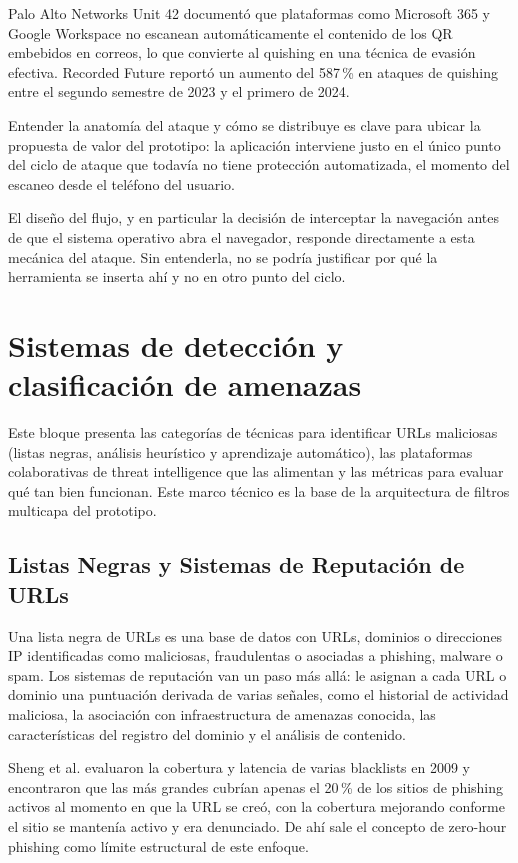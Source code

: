 Palo Alto Networks Unit 42 \cite{unit42_2023qr} document\'o que plataformas como Microsoft 365 y Google Workspace no escanean autom\'aticamente el contenido de los QR embebidos en correos, lo que convierte al quishing en una t\'ecnica de evasi\'on efectiva. Recorded Future \cite{insikt2024qrcode} report\'o un aumento del 587\,\% en ataques de quishing entre el segundo semestre de 2023 y el primero de 2024.

Entender la anatom\'ia del ataque y c\'omo se distribuye es clave para ubicar la propuesta de valor del prototipo: la aplicaci\'on interviene justo en el \'unico punto del ciclo de ataque que todav\'ia no tiene protecci\'on automatizada, el momento del escaneo desde el tel\'efono del usuario.

El dise\~no del flujo, y en particular la decisi\'on de interceptar la navegaci\'on antes de que el sistema operativo abra el navegador, responde directamente a esta mec\'anica del ataque. Sin entenderla, no se podr\'ia justificar por qu\'e la herramienta se inserta ah\'i y no en otro punto del ciclo.

\section{Sistemas de detecci\'on y clasificaci\'on de amenazas}

Este bloque presenta las categor\'ias de t\'ecnicas para identificar URLs maliciosas (listas negras, an\'alisis heur\'istico y aprendizaje autom\'atico), las plataformas colaborativas de threat intelligence que las alimentan y las m\'etricas para evaluar qu\'e tan bien funcionan. Este marco t\'ecnico es la base de la arquitectura de filtros multicapa del prototipo.

\subsection{Listas Negras y Sistemas de Reputaci\'on de URLs}

Una lista negra de URLs es una base de datos con URLs, dominios o direcciones IP identificadas como maliciosas, fraudulentas o asociadas a phishing, malware o spam. Los sistemas de reputaci\'on van un paso m\'as all\'a: le asignan a cada URL o dominio una puntuaci\'on derivada de varias se\~nales, como el historial de actividad maliciosa, la asociaci\'on con infraestructura de amenazas conocida, las caracter\'isticas del registro del dominio y el an\'alisis de contenido.

Sheng et al. \cite{sheng2009empirical} evaluaron la cobertura y latencia de varias blacklists en 2009 y encontraron que las m\'as grandes cubr\'ian apenas el 20\,\% de los sitios de phishing activos al momento en que la URL se cre\'o, con la cobertura mejorando conforme el sitio se manten\'ia activo y era denunciado. De ah\'i sale el concepto de zero-hour phishing como l\'imite estructural de este enfoque.

